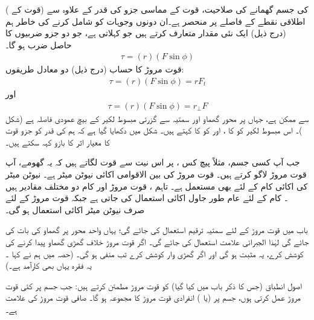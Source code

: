  کی جسم گھمانے کی صلاحیت،  قوت   کے مماسی جزو     کی قدر کے علاوہ  سے   (قوت کے ) اطلاقی نقطے کے  فاصلے پر منحصر ہے۔ان دونوں وجوہات کو شامل کرنے کی خاطر ہم (درج ذیل)  ایک نئی مقدار متعارف کرتے ہیں جو   کہلاتی ہے، جو دو جزو ضربیوں کا حاصل ضرب ہو گا۔
\begin{align}\label{مساوات_گھماو_قوت_مروڑ_فائے}
\tau=(r)(F\sin\phi)
\end{align}
قوت مروڑ کا حساب (درج ذیل)  دو معادل طریقوں:
\begin{align}\label{مساوات_گھماو_قوت_مروڑ_ذرے_پر}
\tau=(r)(F\sin\phi)=rF_t
\end{align}
اور
\begin{align}\label{مساوات_گھماو_صافی_قوت_مروڑ_الف}
\tau=(r)(F\sin\phi)=r_{\perp}F
\end{align}
سے ممکن ہے،  جہاں     پر محور گھماو  اور   سمتیہ  سے گزرتی مبسوط لکیر  کے بیچ عمودی فاصلہ  ہے (شکل )۔ اس مبسوط لکیر کو   کا  ، اور  کو       کا کہتے ہیں۔ شکل  میں دکھایا گیا ہے کہ  ہم  کی قدر  کو  جزو قوت  کا  معیار اثر کا بازو کہہ سکتے ہیں۔

جب آپ کسی جسم،  مثلاً  پیچ کس ، پر اس نیت سے قوت لگاتے ہیں کہ یہ گھومے، آپ قوت مروڑ لاگو کرتے ہیں۔ قوت مروڑ کی بین الاقوامی اکائی نیوٹن میٹر  ہے۔  نیوٹن میٹر کی اکائی کام کے لئے بھی مستعمل ہے۔ تاہم ، قوت مروڑ اور کام دو مختلف مقادیر ہیں ۔ کام کے لئے عام طور جاول  اکائی   استعمال کی جاتی ہے جبکہ قوت مروڑ کے لئے صرف نیوٹن میٹر اکائی  استعمال ہو گی۔

باب  میں قوت مروڑ کے لئے سمتیہ ترقیم استعمال کی جائے گی؛ یہاں   واحد محور پر گھماو کی بات کی جائے گی لہٰذا  الجبرائی علامت  استعمال کی جائے گی۔ اگر  قوت مروڑ خلاف گھڑی گھماو پیدا کرنے کی کوشش کرے،  یہ مثبت ہو گی اور اگر گھڑی وار کوشش کرے تب منفی ہو گی۔ (حصہ  میں ہم نے کہا ۔ یہ فقرہ یہاں بھی  کارآمد ہے۔)

اصول انطباق (جس کا ذکر باب  میں کیا گیا)   کو قوت مروڑ مطمئن کرتے ہیں: جب جسم پر کئی قوت مروڑ عمل کرتی ہوں، جسم پر (یا )  انفرادی قوت مروڑ کا مجموعہ ہو گا۔  صافی قوت مروڑ کی علامت  ہے۔

